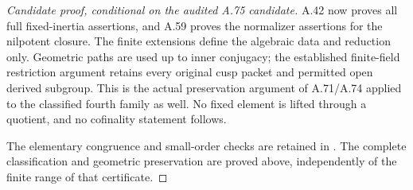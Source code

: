 \begin{proof}[Candidate proof, conditional on the audited A.75 candidate]
A.42 now proves all full fixed-inertia assertions, and
A.59 proves the normalizer assertions for the nilpotent
closure. The finite extensions define the algebraic data
and reduction only. Geometric paths are used up to inner
conjugacy; the established finite-field restriction argument
retains every original cusp packet and permitted open
derived subgroup. This is the actual preservation argument
of A.71/A.74 applied to the classified fourth family as well.
No fixed element is lifted through a quotient, and no
cofinality statement follows.

The elementary congruence and small-order checks are retained
in . The complete
classification and geometric preservation are proved above,
independently of the finite range of that certificate.
\end{proof}
